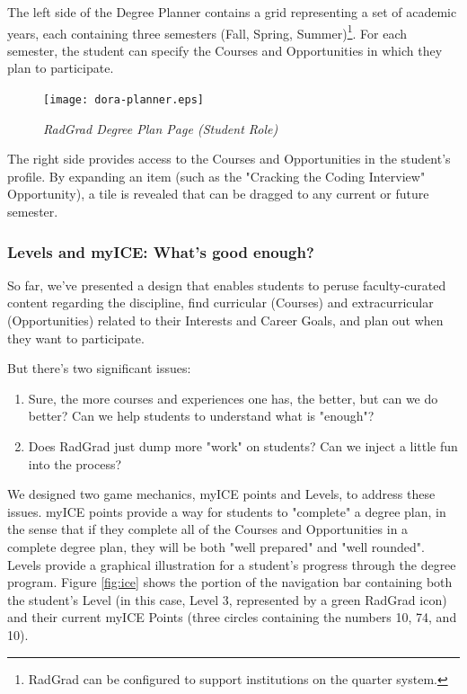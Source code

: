 \documentclass[acmsmall]{acmart}
\begin{document}
The left side of the Degree Planner contains a grid representing a set of academic years, each containing three semesters (Fall, Spring, Summer)\footnote{RadGrad can be configured to support institutions on the quarter system.}.  For each semester, the student can specify the Courses and Opportunities in which they plan to participate.

\begin{figure}[ht]
\centering
\texttt{[image: dora-planner.eps]}
\caption{\em RadGrad Degree Plan Page (Student Role)}
\label{fig:radgrad-student-degree-plan}
\end{figure}

The right side provides access to the Courses and Opportunities in the student's profile. By expanding an item (such as the "Cracking the Coding Interview" Opportunity), a tile is revealed that can be dragged to any current or future semester.

\subsubsection{Levels and myICE: What's good enough?}

So far, we've presented a design that enables students to peruse faculty-curated content regarding the discipline, find curricular (Courses) and extracurricular (Opportunities) related to their Interests and Career Goals, and plan out when they want to participate.

But there's two significant issues:
\begin{enumerate}
\item Sure, the more courses and experiences one has, the better, but can we do better? Can we help students to understand what is "enough"?
\item Does RadGrad just dump more "work" on students? Can we inject a little fun into the process?
\end{enumerate}

We designed two game mechanics, myICE points and Levels, to address these issues.  myICE points provide a way for students to "complete" a degree plan, in the sense that if they complete all of the Courses and Opportunities in a complete degree plan, they will be both "well prepared" and "well rounded".  Levels provide a graphical illustration for a student's progress through the degree program. Figure \ref{fig:ice} shows the portion of the navigation bar containing both the student's Level (in this case, Level 3, represented by a green RadGrad icon) and their current myICE Points (three circles containing the numbers 10, 74, and 10).
\end{document}
